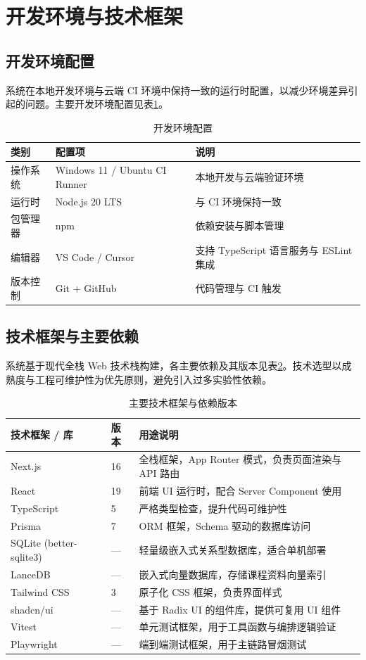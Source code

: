\documentclass[12pt,a4paper,oneside]{ctexbook}
\numberwithin{equation}{chapter}
\begin{document}
\section{开发环境与技术框架}

\subsection{开发环境配置}

系统在本地开发环境与云端 CI 环境中保持一致的运行时配置，以减少环境差异引起的问题。主要开发环境配置见表\ref{tab:devEnv}。

\begin{table}[H]
\centering
\caption{开发环境配置}
\label{tab:devEnv}
\begin{tabular}{p{3cm}p{5cm}p{5.5cm}}
\toprule
类别 & 配置项 & 说明 \\
\midrule
操作系统 & Windows 11 / Ubuntu CI Runner & 本地开发与云端验证环境 \\
运行时 & Node.js 20 LTS & 与 CI 环境保持一致 \\
包管理器 & npm & 依赖安装与脚本管理 \\
编辑器 & VS Code / Cursor & 支持 TypeScript 语言服务与 ESLint 集成 \\
版本控制 & Git + GitHub & 代码管理与 CI 触发 \\
\bottomrule
\end{tabular}
\end{table}

\subsection{技术框架与主要依赖}

系统基于现代全栈 Web 技术栈构建，各主要依赖及其版本见表\ref{tab:techStack}。技术选型以成熟度与工程可维护性为优先原则，避免引入过多实验性依赖。

\begin{table}[H]
\centering
\caption{主要技术框架与依赖版本}
\label{tab:techStack}
\begin{tabular}{p{4.3cm}p{1.5cm}p{9cm}}
\toprule
技术框架 / 库 & 版本 & 用途说明 \\
\midrule
Next.js & 16 & 全栈框架，App Router 模式，负责页面渲染与 API 路由 \\
React & 19 & 前端 UI 运行时，配合 Server Component 使用 \\
TypeScript & 5 & 严格类型检查，提升代码可维护性 \\
Prisma & 7 & ORM 框架，Schema 驱动的数据库访问 \\
SQLite (better-sqlite3) & — & 轻量级嵌入式关系型数据库，适合单机部署 \\
LanceDB & — & 嵌入式向量数据库，存储课程资料向量索引 \\
Tailwind CSS & 3 & 原子化 CSS 框架，负责界面样式 \\
shadcn/ui & — & 基于 Radix UI 的组件库，提供可复用 UI 组件 \\
Vitest & — & 单元测试框架，用于工具函数与编排逻辑验证 \\
Playwright & — & 端到端测试框架，用于主链路冒烟测试 \\
\bottomrule
\end{tabular}
\end{table}
\end{document}
